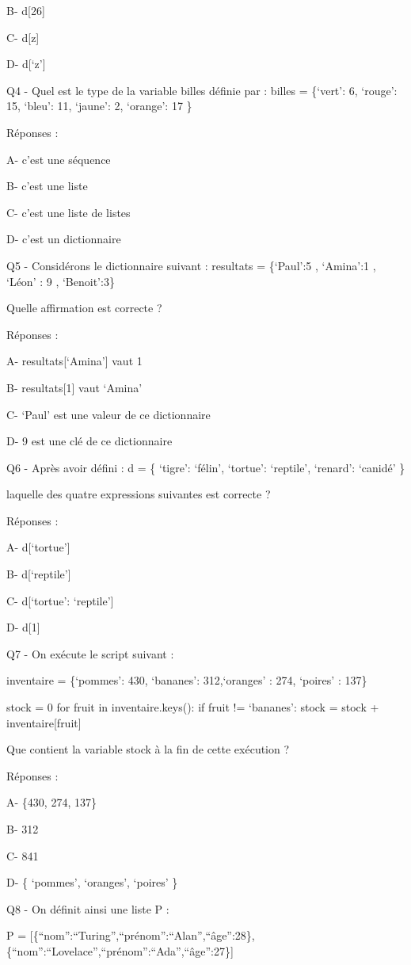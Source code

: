 \documentclass[
]{book}
\begin{document}
B- d{[}26{]}

C- d{[}z{]}

D- d{[}`z'{]}

Q4 - Quel est le type de la variable billes définie par : billes = \{`vert': 6, `rouge': 15, `bleu': 11, `jaune': 2, `orange': 17 \}

Réponses :

A- c'est une séquence

B- c'est une liste

C- c'est une liste de listes

D- c'est un dictionnaire

Q5 - Considérons le dictionnaire suivant : resultats = \{`Paul':5 , `Amina':1 , `Léon' : 9 , `Benoit':3\}

Quelle affirmation est correcte ?

Réponses :

A- resultats{[}`Amina'{]} vaut 1

B- resultats{[}1{]} vaut `Amina'

C- `Paul' est une valeur de ce dictionnaire

D- 9 est une clé de ce dictionnaire

Q6 - Après avoir défini : d = \{ `tigre': `félin', `tortue': `reptile', `renard': `canidé' \}

laquelle des quatre expressions suivantes est correcte ?

Réponses :

A- d{[}`tortue'{]}

B- d{[}`reptile'{]}

C- d{[}`tortue': `reptile'{]}

D- d{[}1{]}

Q7 - On exécute le script suivant :

inventaire = \{`pommes': 430, `bananes': 312,`oranges' : 274, `poires' : 137\}

stock = 0
for fruit in inventaire.keys():
if fruit != `bananes':
stock = stock + inventaire{[}fruit{]}

Que contient la variable stock à la fin de cette exécution ?

Réponses :

A- \{430, 274, 137\}

B- 312

C- 841

D- \{ `pommes', `oranges', `poires' \}

Q8 - On définit ainsi une liste P :

P = {[}\{``nom'':``Turing'',``prénom'':``Alan'',``âge'':28\},\{``nom'':``Lovelace'',``prénom'':``Ada'',``âge'':27\}{]}
\end{document}
